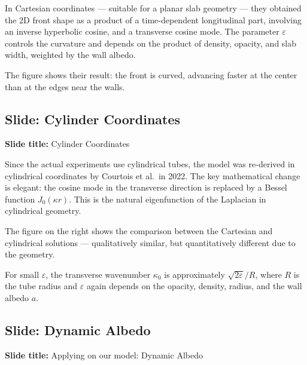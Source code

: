 \documentclass[12pt, a4paper]{article}
\begin{document}
In Cartesian coordinates --- suitable for a planar slab geometry --- they obtained the 2D front shape as a product of a time-dependent longitudinal part, involving an inverse hyperbolic cosine, and a transverse cosine mode. The parameter $\varepsilon$ controls the curvature and depends on the product of density, opacity, and slab width, weighted by the wall albedo.

The figure shows their result: the front is curved, advancing faster at the center than at the edges near the walls.

\subsection{Slide: Cylinder Coordinates}

\begin{slidebox}
\textbf{Slide title:} Cylinder Coordinates
\end{slidebox}

Since the actual experiments use cylindrical tubes, the model was re-derived in cylindrical coordinates by Courtois et al.\ in 2022. The key mathematical change is elegant: the cosine mode in the transverse direction is replaced by a Bessel function $J_0(\kappa r)$. This is the natural eigenfunction of the Laplacian in cylindrical geometry.

The figure on the right shows the comparison between the Cartesian and cylindrical solutions --- qualitatively similar, but quantitatively different due to the geometry.

For small $\varepsilon$, the transverse wavenumber $\kappa_0$ is approximately $\sqrt{2\varepsilon}/R$, where $R$ is the tube radius and $\varepsilon$ again depends on the opacity, density, radius, and the wall albedo $a$.

\subsection{Slide: Dynamic Albedo}

\begin{slidebox}
\textbf{Slide title:} Applying on our model: Dynamic Albedo
\end{slidebox}
\end{document}

